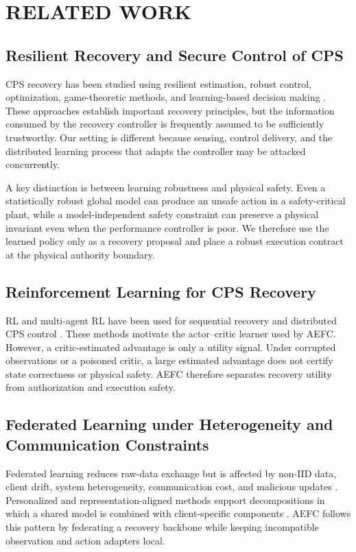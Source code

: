 \section{RELATED WORK}
\subsection{Resilient Recovery and Secure Control of CPS}
CPS recovery has been studied using resilient estimation, robust control, optimization, game-theoretic methods, and learning-based decision making \cite{segovia2024survey,o2024towards,lu2024recovery,yuan2024incomplete,kim2022survey,niu2022verifying,yu2024intelligent,xin2025learning,zhong2024deep}. These approaches establish important recovery principles, but the information consumed by the recovery controller is frequently assumed to be sufficiently trustworthy. Our setting is different because sensing, control delivery, and the distributed learning process that adapts the controller may be attacked concurrently.

A key distinction is between learning robustness and physical safety. Even a statistically robust global model can produce an unsafe action in a safety-critical plant, while a model-independent safety constraint can preserve a physical invariant even when the performance controller is poor. We therefore use the learned policy only as a recovery proposal and place a robust execution contract at the physical authority boundary.

\subsection{Reinforcement Learning for CPS Recovery}
RL and multi-agent RL have been used for sequential recovery and distributed CPS control \cite{olowononi2020resilient,nguyen2021deep,zhang2021physical,jin2025comprehensive,10105656,10393887,yang2024adt,liu2024deadline,wang2023multi}. These methods motivate the actor--critic learner used by AEFC. However, a critic-estimated advantage is only a utility signal. Under corrupted observations or a poisoned critic, a large estimated advantage does not certify state correctness or physical safety. AEFC therefore separates recovery utility from authorization and execution safety.

\subsection{Federated Learning under Heterogeneity and Communication Constraints}
Federated learning reduces raw-data exchange but is affected by non-IID data, client drift, system heterogeneity, communication cost, and malicious updates \cite{kairouz2021advances,li2020federated}. Personalized and representation-aligned methods support decompositions in which a shared model is combined with client-specific components \cite{zhao2026fedara,park2026fedade,le2026feddap,wang2026f2dc}. AEFC follows this pattern by federating a recovery backbone while keeping incompatible observation and action adapters local.

